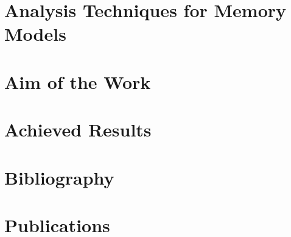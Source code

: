 \documentclass[11pt,twoside,a4paper]{book}
\begin{document}
\chapter{Analysis Techniques for Memory Models}\label{chap:verification}


\chapter{Aim of the Work}\label{chap:aim}


\chapter{Achieved Results}\label{chap:results}


\appendix

\chapter*{Bibliography}
\markboth{}{} %
\printbibliography[heading=none]

\chapter{Publications}
\end{document}
